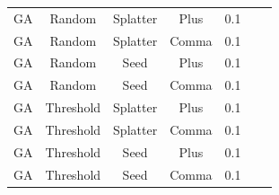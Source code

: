 \begin{table}
\begin{tabular}{|c|c|c|c|c|c|c|}
            GA & Random  & Splatter & Plus & 0.1 & &  \\
            GA & Random  & Splatter & Comma & 0.1 & &  \\
            GA & Random  & Seed & Plus & 0.1 & &  \\
            GA & Random  & Seed & Comma & 0.1 & &  \\
            GA & Threshold  & Splatter & Plus & 0.1 & &  \\
            GA & Threshold  & Splatter & Comma & 0.1 & &  \\
            GA & Threshold  & Seed & Plus & 0.1 & &  \\
            GA & Threshold  & Seed & Comma & 0.1 & &  \\
            \hline
    \end{tabular}
\end{table}